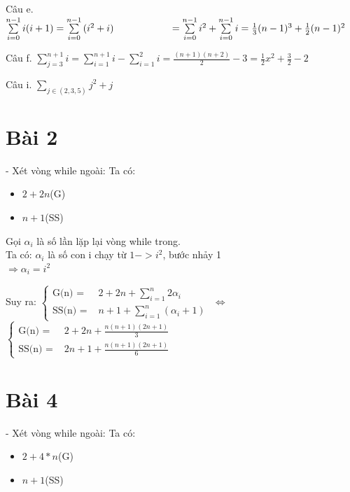 \documentclass{article}
\newcommand\tab[1][1cm]{\hspace*{#1}}
\begin{document}
\vspace{5mm}
Câu e. 
\tab \(\sum\limits_{i=0}^{n-1}{i(i+1)} = \sum\limits_{i=0}^{n-1}{(i^2 + i)}\\
\tab \tab = \sum\limits_{i=0}^{n-1}{i^2} + \sum\limits_{i=0}^{n-1}{i} = \frac{1}{3}(n-1)^3 + \frac{1}{2}(n-1)^2
\)

\vspace{5mm}
Câu f. 
\tab \(\sum\limits_{j=3}^{n+1}{i} = \sum\limits_{i=1}^{n+1}{i} - \sum\limits_{i=1}^{2}{i} = \frac{(n+1)(n+2)}{2} - 3 = \frac{1}{2}x^2 + \frac{3}{2} - 2 \)

\vspace{5mm}
Câu i. 
\tab \(\sum\limits_{j\in (2,3,5)}^{ }{j^2 + j} \)

\section*{Bài 2}

- Xét vòng while ngoài:
Ta có:
\begin{itemize}
    \item $ 2+2n $(G)
    \item $ n + 1 $(SS)
\end{itemize}

Gọi $\alpha_{i}$ là số lần lặp lại vòng while trong.\\
Ta có: $\alpha_{i}$ là số con i chạy từ $ 1 -> i^2$, bước nhảy 1 \\
\(\Rightarrow \alpha_{i} = i^2 \)


\tab Suy ra:
\(
\begin{cases}
    \text{G(n) = } & 2 +2n +  \sum\limits_{i=1}^{n}2\alpha_{i} \\
    \text{SS(n) = } &  n + 1 + \sum\limits_{i=1}^{n}(\alpha_{i}+1)
\end{cases}
\)
\tab $\Leftrightarrow $
\(
\begin{cases}
    \text{G(n) = } & 2 +2n +  \frac{n(n+1)(2n+1)}{3} \\
    \text{SS(n) = } &  2n + 1 + \frac{n(n+1)(2n+1)}{6}
\end{cases}
\)
\section*{Bài 4}

- Xét vòng while ngoài:
Ta có:
\begin{itemize}
    \item $ 2+4*n $(G)
    \item $ n + 1 $(SS)
\end{itemize}
\end{document}
